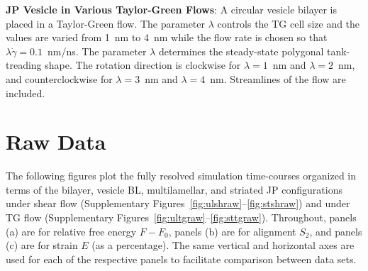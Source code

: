 
\noindent
{\bf JP Vesicle in Various Taylor-Green Flows}: A circular vesicle
bilayer is placed in a Taylor-Green flow. The parameter $\lambda$
controls the TG cell size and the values are varied from 1~nm to 4~nm
while the flow rate is chosen so that $\lambda\dot\gamma=0.1$~nm/ns. The
parameter $\lambda$ determines the steady-state polygonal tank-treading
shape. The rotation direction is clockwise for $\lambda=1$~nm and
$\lambda=2$~nm, and counterclockwise for $\lambda=3$~nm and
$\lambda=4$~nm. Streamlines of the flow are included.



\section{Raw Data}
The following figures plot the fully resolved simulation time-courses
organized in terms of the bilayer, vesicle BL, multilamellar, and
striated JP configurations under shear flow (Supplementary
Figures~\ref{fig:ulshraw}--\ref{fig:stshraw}) and under TG flow
(Supplementary Figures~\ref{fig:ultgraw}--\ref{fig:sttgraw}).
Throughout, panels (a) are for relative free energy $F - F_0$, panels
(b) are for alignment $S_2$, and panels (c) are for strain $E$ (as a
percentage). The same vertical and horizontal axes are used for each of
the respective panels to facilitate comparison between data sets. 

